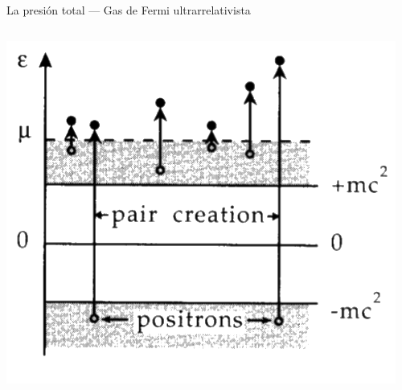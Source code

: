 \documentclass{beamer}
\begin{document}
\begin{frame}{La presión total — Gas de Fermi ultrarrelativista}
\begin{columns}

    \centering
    \includegraphics[width=\linewidth]{figures/creacion_pares.png}
  \end{columns}
\end{frame}
\end{document}
